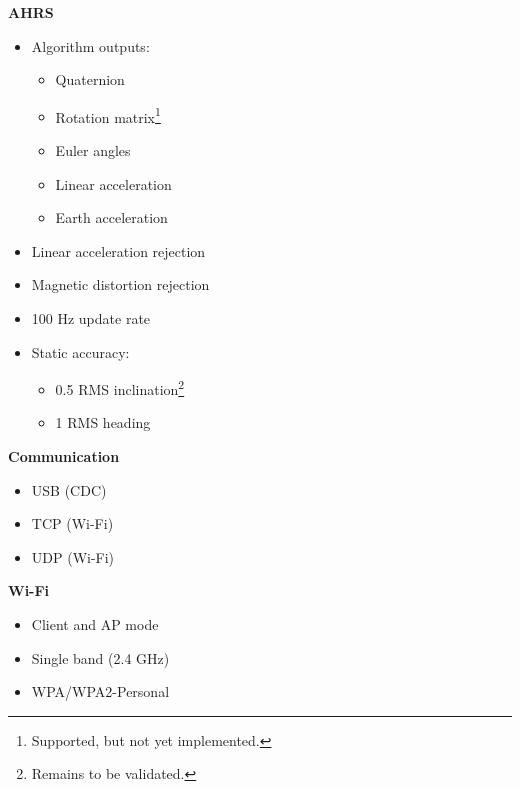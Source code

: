 \begin{multicols}{2}
\textbf{\acs{AHRS}}
\begin{itemize}[nolistsep]
    \item Algorithm outputs:
    \begin{itemize}
        \item Quaternion
        \item Rotation matrix\footnote{Supported, but not yet implemented.}
        \item Euler angles
        \item Linear acceleration\footnotemark[\value{footnote}]
        \item Earth acceleration\footnotemark[\value{footnote}]
    \end{itemize}
    \item Linear acceleration rejection\footnotemark[\value{footnote}]
    \item Magnetic distortion rejection\footnotemark[\value{footnote}]
    \item 100 Hz update rate
    \item Static accuracy:
        \begin{itemize}
            \item 0.5\textdegree{} \acs{RMS} inclination\footnote{Remains to be validated.}
            \item 1\textdegree{} \acs{RMS} heading\footnotemark[\value{footnote}]
        \end{itemize}
\end{itemize}

\columnbreak

\textbf{Communication}
\begin{itemize}[nolistsep]
    \item \acs{USB} (\acs{CDC})
    \item \acs{TCP} (Wi-Fi)\footnotemark[\numexpr\value{footnote}-1\relax]
    \item \acs{UDP} (Wi-Fi)
\end{itemize}

\textbf{Wi-Fi}
\begin{itemize}[nolistsep]
    \item Client and \acs{AP} mode
    \item Single band (2.4 GHz)
    \item WPA/WPA2-Personal
\end{itemize}


\end{multicols}
